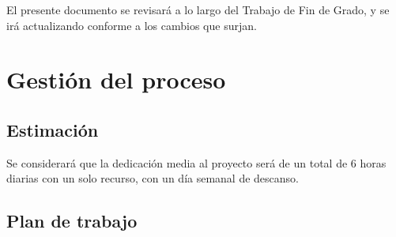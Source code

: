 \documentclass[openright,twoside,10pt]{book}
\begin{document}
    El presente documento se revisará a lo largo del Trabajo de Fin de
    Grado, y se irá actualizando conforme a los cambios que surjan.
    
    \section{Gestión del proceso}\label{gestiuxf3n-del-proceso}
    
    \subsection{Estimación}\label{estimaciuxf3n}
    
    Se considerará que la dedicación media al proyecto será de un total de 6
    horas diarias con un solo recurso, con un día semanal de descanso.
    
    \subsection{Plan de trabajo}\label{plan-de-trabajo}
    
\end{document}
